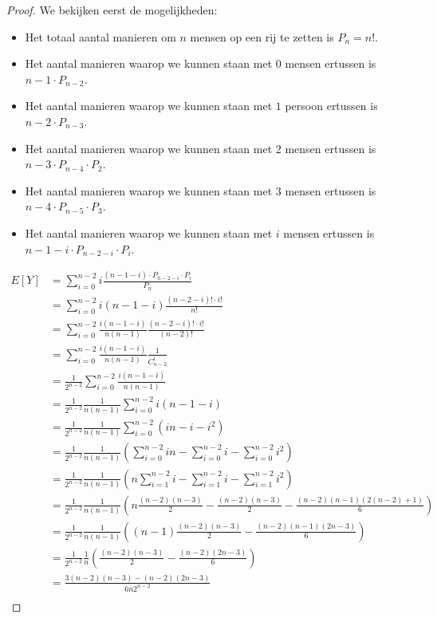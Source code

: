 \documentclass[main.tex]{subfiles}
\begin{document}
\begin{oef}
\begin{proof}
    We bekijken eerst de mogelijkheden:
    \begin{itemize}
    \item Het totaal aantal manieren om $n$ mensen op een rij te zetten is $P_{n}=n!$.
    \item Het aantal manieren waarop we kunnen staan met $0$ mensen ertussen is $n-1 \cdot P_{n-2}$.
    \item Het aantal manieren waarop we kunnen staan met $1$ persoon ertussen is $n-2 \cdot P_{n-3}$.
    \item Het aantal manieren waarop we kunnen staan met $2$ mensen ertussen is $n-3 \cdot P_{n-4} \cdot P_{2}$.
    \item Het aantal manieren waarop we kunnen staan met $3$ mensen ertussen is $n-4 \cdot P_{n-5} \cdot P_{3}$.
    \item Het aantal manieren waarop we kunnen staan met $i$ mensen ertussen is $n-1-i \cdot P_{n-2-i} \cdot P_{i}$.
    \end{itemize}
    \[ 
    \begin{array}{rl}
    E[Y]
    &= \sum_{i=0}^{n-2}i \frac{(n-1-i) \cdot P_{n-2-i} \cdot P_{i}}{P_{n}}\\
    &= \sum_{i=0}^{n-2}i(n-1-i) \frac{(n-2-i)! \cdot i!}{n!}\\
    &= \sum_{i=0}^{n-2}\frac{i(n-1-i)}{n(n-1)} \frac{(n-2-i)! \cdot i!}{(n-2)!}\\
    &= \sum_{i=0}^{n-2}\frac{i(n-1-i)}{n(n-1)} \frac{1}{C_{n-2}^{i}}\\
    &= \frac{1}{2^{n-2}}\sum_{i=0}^{n-2}\frac{i(n-1-i)}{n(n-1)}\\
    &= \frac{1}{2^{n-2}}\frac{1}{n(n-1)}\sum_{i=0}^{n-2}i(n-1-i)\\
    &= \frac{1}{2^{n-2}}\frac{1}{n(n-1)}\sum_{i=0}^{n-2}(in-i-i^{2})\\
    &= \frac{1}{2^{n-2}}\frac{1}{n(n-1)}\left(\sum_{i=0}^{n-2}in-\sum_{i=0}^{n-2}i-\sum_{i=0}^{n-2}i^{2}\right)\\
    &= \frac{1}{2^{n-2}}\frac{1}{n(n-1)}\left(n\sum_{i=1}^{n-2}i-\sum_{i=1}^{n-2}i-\sum_{i=1}^{n-2}i^{2}\right)\\
    &= \frac{1}{2^{n-2}}\frac{1}{n(n-1)}\left(n\frac{(n-2)(n-3)}{2}-\frac{(n-2)(n-3)}{2}-\frac{(n-2)(n-1)(2(n-2)+1)}{6}\right)\\
    &= \frac{1}{2^{n-2}}\frac{1}{n(n-1)}\left((n-1)\frac{(n-2)(n-3)}{2}-\frac{(n-2)(n-1)(2n-3)}{6}\right)\\
    &= \frac{1}{2^{n-2}}\frac{1}{n}\left(\frac{(n-2)(n-3)}{2}-\frac{(n-2)(2n-3)}{6}\right)\\
    &= \frac{3(n-2)(n-3) - (n-2)(2n-3)}{6n 2^{n-2}}\\
    \end{array}
    \]
  \end{proof}
\end{oef}
\end{document}

